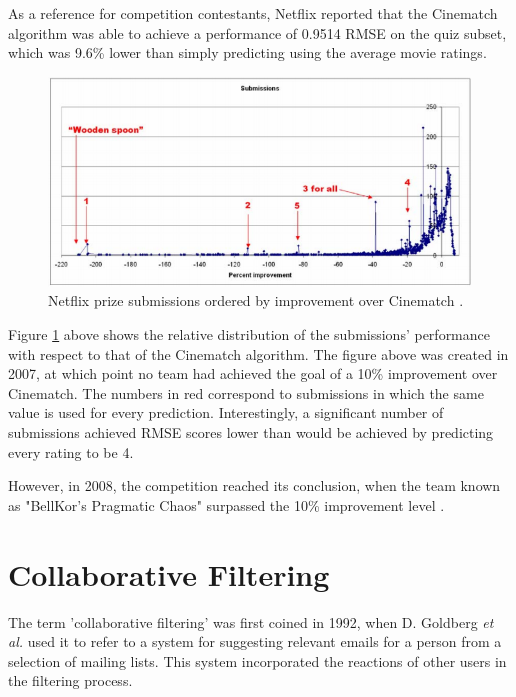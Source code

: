 As a reference for competition contestants, Netflix reported that the Cinematch algorithm was able to achieve a performance of 0.9514 RMSE on the quiz subset, which was 9.6\% lower than simply predicting using the average movie ratings. \parencite{netflix_description}

\begin{figure}[H]
\centering
\includegraphics[width=13cm]{Figures/2_1_netflix-prize.png}
\decoRule
\caption[Netflix submissions]{Netflix prize submissions ordered by improvement over Cinematch \parencite{netflix_description}.}
\label{fig:netflix_submissions}
\end{figure}

Figure \ref{fig:netflix_submissions} above shows the relative distribution of the submissions' performance with respect to that of the Cinematch algorithm. The figure above was created in 2007, at which point no team had achieved the goal of a 10\% improvement over Cinematch. The numbers in red correspond to submissions in which the same value is used for every prediction. Interestingly, a significant number of submissions achieved RMSE scores lower than would be achieved by predicting every rating to be 4.

However, in 2008, the competition reached its conclusion, when the team known as "BellKor's Pragmatic Chaos" surpassed the 10\% improvement level \parencite{netflix_bellkor}.

\section{Collaborative Filtering}
The term 'collaborative filtering' was first coined in 1992, when D. Goldberg \textit{et al.} used it to refer to a system for suggesting relevant emails for a person from a selection of mailing lists. This system incorporated the reactions of other users in the filtering process. \parencite{cf_1.3_origin}

